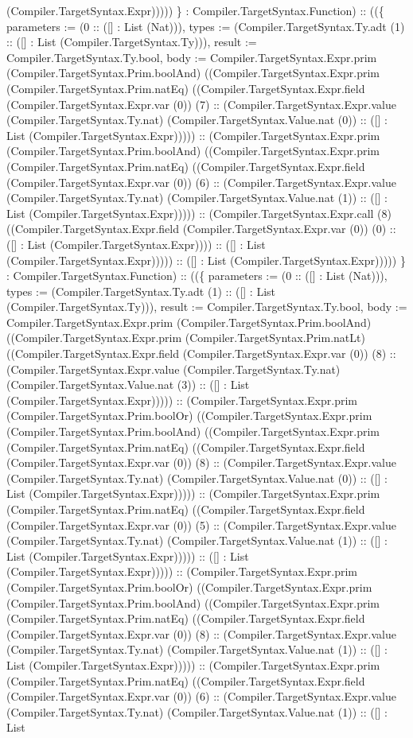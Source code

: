 \documentclass[11pt]{article}
\begin{document}
(Compiler.TargetSyntax.Expr))))) \} : Compiler.TargetSyntax.Function) :: ((\{ parameters := (0 :: ([] : List (Nat))), types := (Compiler.TargetSyntax.Ty.adt (1) :: ([] : List (Compiler.TargetSyntax.Ty))), result := Compiler.TargetSyntax.Ty.bool, body := Compiler.TargetSyntax.Expr.prim (Compiler.TargetSyntax.Prim.boolAnd) ((Compiler.TargetSyntax.Expr.prim (Compiler.TargetSyntax.Prim.natEq) ((Compiler.TargetSyntax.Expr.field (Compiler.TargetSyntax.Expr.var (0)) (7) :: (Compiler.TargetSyntax.Expr.value (Compiler.TargetSyntax.Ty.nat) (Compiler.TargetSyntax.Value.nat (0)) :: ([] : List (Compiler.TargetSyntax.Expr))))) :: (Compiler.TargetSyntax.Expr.prim (Compiler.TargetSyntax.Prim.boolAnd) ((Compiler.TargetSyntax.Expr.prim (Compiler.TargetSyntax.Prim.natEq) ((Compiler.TargetSyntax.Expr.field (Compiler.TargetSyntax.Expr.var (0)) (6) :: (Compiler.TargetSyntax.Expr.value (Compiler.TargetSyntax.Ty.nat) (Compiler.TargetSyntax.Value.nat (1)) :: ([] : List (Compiler.TargetSyntax.Expr))))) :: (Compiler.TargetSyntax.Expr.call (8) ((Compiler.TargetSyntax.Expr.field (Compiler.TargetSyntax.Expr.var (0)) (0) :: ([] : List (Compiler.TargetSyntax.Expr)))) :: ([] : List (Compiler.TargetSyntax.Expr))))) :: ([] : List (Compiler.TargetSyntax.Expr))))) \} : Compiler.TargetSyntax.Function) :: ((\{ parameters := (0 :: ([] : List (Nat))), types := (Compiler.TargetSyntax.Ty.adt (1) :: ([] : List (Compiler.TargetSyntax.Ty))), result := Compiler.TargetSyntax.Ty.bool, body := Compiler.TargetSyntax.Expr.prim (Compiler.TargetSyntax.Prim.boolAnd) ((Compiler.TargetSyntax.Expr.prim (Compiler.TargetSyntax.Prim.natLt) ((Compiler.TargetSyntax.Expr.field (Compiler.TargetSyntax.Expr.var (0)) (8) :: (Compiler.TargetSyntax.Expr.value (Compiler.TargetSyntax.Ty.nat) (Compiler.TargetSyntax.Value.nat (3)) :: ([] : List (Compiler.TargetSyntax.Expr))))) :: (Compiler.TargetSyntax.Expr.prim (Compiler.TargetSyntax.Prim.boolOr) ((Compiler.TargetSyntax.Expr.prim (Compiler.TargetSyntax.Prim.boolAnd) ((Compiler.TargetSyntax.Expr.prim (Compiler.TargetSyntax.Prim.natEq) ((Compiler.TargetSyntax.Expr.field (Compiler.TargetSyntax.Expr.var (0)) (8) :: (Compiler.TargetSyntax.Expr.value (Compiler.TargetSyntax.Ty.nat) (Compiler.TargetSyntax.Value.nat (0)) :: ([] : List (Compiler.TargetSyntax.Expr))))) :: (Compiler.TargetSyntax.Expr.prim (Compiler.TargetSyntax.Prim.natEq) ((Compiler.TargetSyntax.Expr.field (Compiler.TargetSyntax.Expr.var (0)) (5) :: (Compiler.TargetSyntax.Expr.value (Compiler.TargetSyntax.Ty.nat) (Compiler.TargetSyntax.Value.nat (1)) :: ([] : List (Compiler.TargetSyntax.Expr))))) :: ([] : List (Compiler.TargetSyntax.Expr))))) :: (Compiler.TargetSyntax.Expr.prim (Compiler.TargetSyntax.Prim.boolOr) ((Compiler.TargetSyntax.Expr.prim (Compiler.TargetSyntax.Prim.boolAnd) ((Compiler.TargetSyntax.Expr.prim (Compiler.TargetSyntax.Prim.natEq) ((Compiler.TargetSyntax.Expr.field (Compiler.TargetSyntax.Expr.var (0)) (8) :: (Compiler.TargetSyntax.Expr.value (Compiler.TargetSyntax.Ty.nat) (Compiler.TargetSyntax.Value.nat (1)) :: ([] : List (Compiler.TargetSyntax.Expr))))) :: (Compiler.TargetSyntax.Expr.prim (Compiler.TargetSyntax.Prim.natEq) ((Compiler.TargetSyntax.Expr.field (Compiler.TargetSyntax.Expr.var (0)) (6) :: (Compiler.TargetSyntax.Expr.value (Compiler.TargetSyntax.Ty.nat) (Compiler.TargetSyntax.Value.nat (1)) :: ([] : List 
\end{document}
